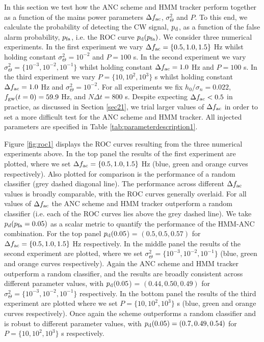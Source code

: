 \documentclass[pra,superscriptaddress,reprint,amsmath,amssymb,nofootinbib]{revtex4-2}
\begin{document}
In this section we test how the ANC scheme and HMM tracker perform together as a function of the mains power parameters $\Delta f_{\rm ac}$, $\sigma_\Theta^2$ and $P$. To this end, we calculate the probability of detecting the CW signal, $p_{\rm d}$, as a function of the false alarm probability, $p_{\rm fa}$, i.e. the ROC curve $p_{\rm d} (p_{\rm fa})$. We consider three numerical experiments. In the first experiment we vary $\Delta f_{\rm ac} =  \{0.5, 1.0, 1.5\}$ Hz whilst holding constant $\sigma_{\Theta}^2 = 10^{-2}$ and $P = 100 $ s. In the second experiment we vary $\sigma_{\Theta}^2 =  \{ 10^{-3}, 10^{-2}, 10^{-1}\}$ whilst holding constant $\Delta f_{\rm ac} = 1.0$ Hz and $P = 100 $ s. In the third experiment we vary $P=  \{ 10, 10^2, 10^3\}$ s whilst holding constant $\Delta f_{\rm ac} = 1.0$ Hz and $\sigma_{\Theta}^2 = 10^{-2}$. For all experiments we fix $h_0 / \sigma_n = 0.022$, $f_{\rm gw}(t=0) = 59.9$ Hz, and $N \Delta t = 800$ s. Despite expecting $\Delta f_{\rm ac} < 0.5$ in practice, as discussed in Section \ref{sec21}, we trial larger values of $\Delta f_{\rm ac}$ in order to set a more difficult test for the ANC scheme and HMM tracker. All injected parameters are specified in Table \ref{tab:parameterdescription1}. \newline 


Figure \ref{fig:roc1} displays the ROC curves resulting from the three numerical experiments above. In the top panel the results of the first experiment are plotted, where we set  $\Delta f_{\rm ac} = \{0.5, 1.0, 1.5\}$ Hz (blue, green and orange curves respectively). Also plotted for comparison is the performance of a random classifier (grey dashed diagonal line). The performance across different $\Delta f_{\rm ac}$ values is broadly comparable, with the ROC curves generally overlaid. For all values of $\Delta f_{\rm ac}$ the ANC scheme and HMM tracker outperform a random classifier (i.e. each of the ROC curves lies above the grey dashed line). We take $p_{d}(p_{\rm fa} =0.05)$ as a scalar metric to quantify the performance of the HMM-ANC combination. For the top panel $p_{\rm d}(0.05$) = $(0.5, 0.5, 0.57)$ for $\Delta f_{\rm ac} =  \{0.5, 1.0, 1.5\}$ Hz respectively. In the middle panel the results of the second experiment are plotted, where we set  $\sigma_{\Theta}^2 =  \{ 10^{-3}, 10^{-2}, 10^{-1}\}$  (blue, green and orange curves respectively). Again the ANC scheme and HMM tracker outperform a random classifier, and the results are broadly consistent across different parameter values, with $p_{\rm d}(0.05$) = $(0.44,0.50,0.49)$ for $\sigma_{\Theta}^2 =  \{ 10^{-3}, 10^{-2}, 10^{-1}\}$ respectively. In the bottom panel the results of the third experiment are plotted where we set $P=  \{ 10, 10^2, 10^3\}$ s (blue, green and orange curves respectively). Once again the scheme outperforms a random classifier and is robust to different parameter values, with $p_{\rm d}(0.05) = (0.7,0.49,0.54)$ for $P=  \{ 10, 10^2, 10^3\}$ s respectively.
\end{document}
